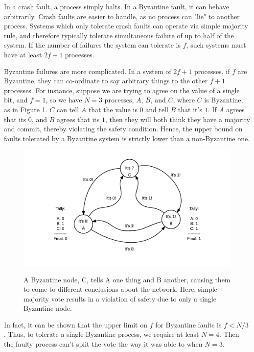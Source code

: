 In a crash fault, a process simply halts. In a Byzantine fault, it can behave arbitrarily.
Crash faults are easier to handle, as no process can "lie" to another process.
Systems which only tolerate crash faults can operate via simple majority rule, 
and therefore typically tolerate simultaneous failure of up to half of the system.
If the number of failures the system can tolerate is $f$, such systems must have at least $2f+1$ processes.

Byzantine failures are more complicated. In a system of $2f+1$ processes, if $f$ are Byzantine, 
they can co-ordinate to say arbitrary things to the other $f+1$ processes.
For instance, suppose we are trying to agree on the value of a single bit, 
and $f=1$, so we have $N=3$ processes, $A$, $B$, and $C$, where $C$ is Byzantine, as in Figure \ref{fig:byzantine}.
$C$ can tell $A$ that the value is $0$ and tell $B$ that it's $1$. 
If $A$ agrees that its $0$, and $B$ agrees that its $1$, then they will both think they have a majority and commit, 
thereby violating the safety condition.
Hence, the upper bound on faults tolerated by a Byzantine system is strictly lower than a non-Byzantine one.

\begin{figure}[]
	\includegraphics[width=\linewidth,height=\textheight,keepaspectratio]{figures/byzantine.png}
    	\centering
	\label{fig:byzantine}
	\caption[Byzantine nodes tell lies]{
A Byzantine node, C, tells A one thing and B another, causing them to come to different conclusions about the network.
Here, simple majority vote results in a violation of safety due to only a single Byzantine node.}
\end{figure}


In fact, it can be shown that the upper limit on $f$ for Byzantine faults is $f < N/3$ \cite{pease1980reaching}.
Thus, to tolerate a single Byzantine process, we require at least $N=4$. 
Then the faulty process can't split the vote the way it was able to when $N=3$.


